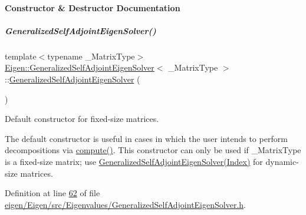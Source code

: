 \paragraph{Constructor \& Destructor Documentation}
\mbox{\label{group___eigenvalues___module_a501effdbf722c0609ea05ff3fd4cc721}} 
\subparagraph{\texorpdfstring{Generalized\+Self\+Adjoint\+Eigen\+Solver()}{GeneralizedSelfAdjointEigenSolver()}\hspace{0.1cm}{\footnotesize\ttfamily [1/6]}}
{\footnotesize\ttfamily template$<$typename \+\_\+\+Matrix\+Type$>$ \\
\hyperlink{group___eigenvalues___module_class_eigen_1_1_generalized_self_adjoint_eigen_solver}{Eigen\+::\+Generalized\+Self\+Adjoint\+Eigen\+Solver}$<$ \+\_\+\+Matrix\+Type $>$\+::\hyperlink{group___eigenvalues___module_class_eigen_1_1_generalized_self_adjoint_eigen_solver}{Generalized\+Self\+Adjoint\+Eigen\+Solver} (\begin{DoxyParamCaption}{ }\end{DoxyParamCaption})\hspace{0.3cm}{\ttfamily [inline]}}



Default constructor for fixed-\/size matrices. 

The default constructor is useful in cases in which the user intends to perform decompositions via \hyperlink{group___eigenvalues___module_a724764fe196612b752042692156ed023}{compute()}. This constructor can only be used if {\ttfamily \+\_\+\+Matrix\+Type} is a fixed-\/size matrix; use \hyperlink{group___eigenvalues___module_aac849f01a8c6148c645acd10bd3a9b0e}{Generalized\+Self\+Adjoint\+Eigen\+Solver(\+Index)} for dynamic-\/size matrices. 

Definition at line \hyperlink{eigen_2_eigen_2src_2_eigenvalues_2_generalized_self_adjoint_eigen_solver_8h_source_l00062}{62} of file \hyperlink{eigen_2_eigen_2src_2_eigenvalues_2_generalized_self_adjoint_eigen_solver_8h_source}{eigen/\+Eigen/src/\+Eigenvalues/\+Generalized\+Self\+Adjoint\+Eigen\+Solver.\+h}.

